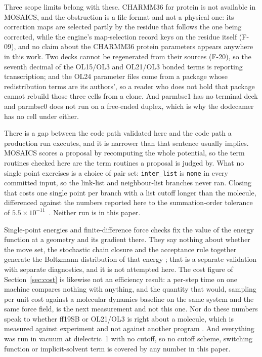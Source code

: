 Three scope limits belong with these. CHARMM36 for protein is not available in
MOSAICS, and the obstruction is a file format and not a physical one: its
correction maps are selected partly by the residue that follows the one being
corrected, while the engine's map-selection record keys on the residue itself
(F-09), and no claim about the CHARMM36 protein parameters
\cite{best2012charmm36,huang2017charmm36m} appears anywhere in this work. Two
decks cannot be regenerated from their sources (F-20), so the seventh decimal
of the OL15/OL3 and OL21/OL3 bonded terms is reporting transcription; and the
OL24 parameter files come from a package whose redistribution terms are its
authors', so a reader who does not hold that package cannot rebuild those three
cells from a clone. And parmbsc1 has no terminal deck and parmbsc0 does not run
on a free-ended duplex, which is why the dodecamer has no cell under either.

There is a gap between the code path validated here and the code path a
production run executes, and it is narrower than that sentence usually implies.
MOSAICS scores a proposal by recomputing the whole potential, so the term
routines checked here are the term routines a proposal is judged by. What no
single point exercises is a choice of pair set: \texttt{inter\_list} is
\texttt{none} in every committed input, so the link-list and neighbour-list
branches never ran. Closing that costs one single point per branch with a list
cutoff longer than the molecule, differenced against the numbers reported here
to the summation-order tolerance of $5.5\times10^{-11}$~\kcal{}. Neither run is
in this paper.

Single-point energies and finite-difference force checks fix the value of the
energy function at a geometry and its gradient there. They say nothing about
whether the move set, the stochastic chain closure and the acceptance rule
together generate the Boltzmann distribution of that energy
\cite{minary2010chainclosure,hatch2025mcbestpractices}; that is a separate
validation with separate diagnostics, and it is not attempted here. The cost
figure of Section~\ref{sec:cost} is likewise not an efficiency result: a
per-step time on one machine compares nothing with anything, and the quantity
that would, sampling per unit cost against a molecular dynamics baseline on the
same system and the same force field, is the next measurement and not this
one. Nor do these numbers speak to whether ff19SB or OL21/OL3 is right about a
molecule, which is measured against experiment and not against another program
\cite{lindorfflarsen2012validation,beauchamp2012benchmark,love2023amberdna}.
And everything was run in vacuum at dielectric~1 with no cutoff, so no cutoff
scheme, switching function or implicit-solvent term is covered by any number in
this paper.


